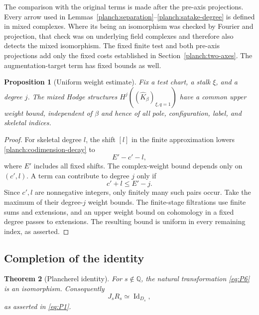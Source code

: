 \documentclass[11pt]{article}
\numberwithin{equation}{section}
\newtheorem{theorem}{Theorem}[section]
\newtheorem{proposition}[theorem]{Proposition}
\theoremstyle{definition}
\theoremstyle{remark}
\begin{document}
The comparison with the original terms is made after the pre-axis
projections.  Every arrow used in
Lemmas~\ref{planch:separation}--\ref{planch:satake-degree} is
defined in mixed complexes.  Where its being an isomorphism was
checked by Fourier and projection, that check was on underlying
field complexes and therefore also detects the mixed isomorphism.
The fixed finite test and both pre-axis projections add only the
fixed costs established in Section~\ref{planch:two-axes}.
The augmentation-target term has fixed bounds as well.

\begin{proposition}[Uniform weight estimate]
\label{planch:weight-estimate}
Fix a test chart, a stalk $\xi$, and a degree $j$.  The mixed Hodge
structures $H^j((\widehat K_\beta)_{\xi,q=1})$ have a common upper
weight bound, independent of $\beta$ and hence of all pole,
configuration, label, and skeletal indices.
\end{proposition}

\begin{proof}
For skeletal degree $l$, the shift $[l]$ in the finite approximation
lowers \eqref{planch:codimension-decay} to
\[
 E'-c'-l,
\]
where $E'$ includes all fixed shifts.  The complex-weight bound
depends only on $(c',l)$.  A term can contribute to degree $j$
only if
\[
 c'+l\leq E'-j.
\]
Since $c',l$ are nonnegative integers, only finitely many such
pairs occur.  Take the maximum of their degree-$j$ weight bounds.
The finite-stage filtrations use finite sums and extensions, and
an upper weight bound on cohomology in a fixed degree passes to
extensions.  The resulting bound is uniform in every remaining
index, as asserted.
\end{proof}

\subsection{Completion of the identity}

\begin{theorem}[Plancherel identity]
\label{planch:identity}
For $s\notin\mathbb Q$, the natural transformation \eqref{eq:P6}
is an isomorphism.  Consequently
\[
 J_sR_s\simeq\operatorname{Id}_{D_s},
\]
as asserted in \eqref{eq:P1}.
\end{theorem}
\end{document}
